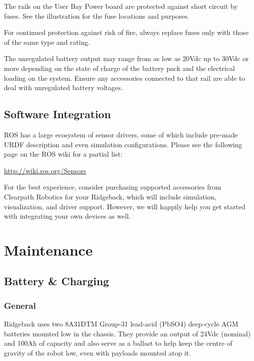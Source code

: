 \documentclass[]{clearpath-latex/clearpath-manual}
\begin{document}
The rails on the User Bay Power board are protected against short circuit by fuses. See the illustration for the fuse locations and purposes.

\begin{warning}
For continued protection against risk of fire, always replace fuses only with those of the same type and rating.
\end{warning}

\begin{warning}
The unregulated battery output may range from as low as 20Vdc up to 30Vdc or more depending on the state of charge of the battery pack and the electrical loading on the system. Ensure any accessories connected to that rail are able to deal with unregulated battery voltages.
\end{warning}


\subsection{Software Integration}

ROS has a large ecosystem of sensor drivers, some of which include pre-made URDF description and even simulation configurations.  Please see the following page on the ROS wiki for a partial list:

\url{http://wiki.ros.org/Sensors}

For the best experience, consider purchasing supported accessories from Clearpath Robotics for your Ridgeback, which will include simulation, visualization, and driver support.  However, we will happily help you get started with integrating your own devices as well.

\section{Maintenance}

\subsection{Battery \& Charging}

\subsubsection{General}

Ridgeback uses two 8A31DTM Group-31 lead-acid (PbSO4) deep-cycle AGM batteries mounted low in the chassis. They provide an output of 24Vdc (nominal) and 100Ah of capacity and also serve as a ballast to help keep the centre of gravity of the robot low, even with payloads mounted atop it.
\end{document}
